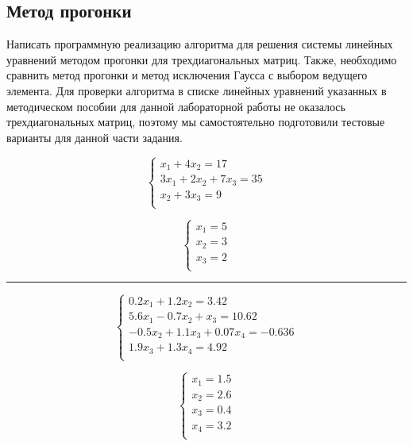 \documentclass{article}
\begin{document}
\subsection{Метод прогонки}
Написать программную реализацию алгоритма для решения системы линейных
уравнений методом прогонки для трехдиагональных матриц.
Также, необходимо сравнить метод прогонки и метод исключения Гаусса с выбором
ведущего элемента.
Для проверки алгоритма в списке линейных уравнений указанных
в методическом пособии для данной лабораторной работы не оказалось трехдиагональных матриц,
поэтому мы самостоятельно подготовили тестовые варианты для данной
части задания.
\begin{multicols}{2}
\begin{displaymath}
  \left\{ \begin{array}{ll}
  x_{1} + 4x_{2} = 17\\
  3x_{1} + 2x_{2} + 7x_{3} = 35\\
  x_{2} + 3x_{3} = 9\\
\end{array} \right.
\end{displaymath}

\begin{displaymath}
\left\{ \begin{array}{ll}
  x_{1} = 5\\
  x_{2} = 3\\
  x_{3} = 2\\
\end{array} \right.
\end{displaymath}
\end{multicols}
\rule[1mm]{10cm}{0.1mm}
\begin{multicols}{2}
\begin{displaymath}
  \left\{ \begin{array}{ll}
  0.2x_{1} + 1.2x_{2} = 3.42\\
  5.6x_{1} - 0.7x_{2} + x_{3} = 10.62\\
  -0.5x_{2} + 1.1x_{3} + 0.07x_{4} = -0.636\\
  1.9x_{3} + 1.3x_{4} = 4.92\\
\end{array} \right.
\end{displaymath}

\begin{displaymath}
\left\{ \begin{array}{ll}
  x_{1} = 1.5\\
  x_{2} = 2.6\\
  x_{3} = 0.4\\
  x_{4} = 3.2\\
\end{array} \right.
\end{displaymath}
\end{multicols}
\end{document}

